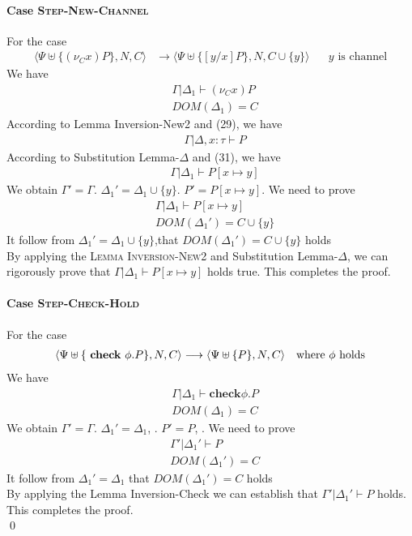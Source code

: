 \documentclass[master,english]{kuisthesis}
\theoremstyle{definition}
\begin{document}
\paragraph{Case \textsc{Step-New-Channel}} For the case
\begin{align*}
  \langle\Psi \uplus\{(\nu_C x) P\}, N, C\rangle &\longrightarrow\langle\Psi \uplus\{[y / x] P\}, N, C \cup \{y\}\rangle \quad \text{ $y$ is channel} 
\end{align*}\noindent
We have
\begin{align}
    &\Gamma | \Delta_1 \vdash (\nu_C x)P
    \\&DOM(\Delta_1) = C 
\end{align}\noindent
According to Lemma Inversion-New2 and (29), we have
\begin{align}
    &\Gamma |\Delta, x : \tau \vdash P  
\end{align}\noindent
According to Substitution Lemma-$\Delta$ and (31), we have
\begin{align}
    &\Gamma | \Delta_1 \vdash P[x \mapsto y]  
\end{align}\noindent
We obtain $\Gamma' = \Gamma  $. $\Delta_1' = \Delta_1 \cup \{y\} $. $P' = P[x \mapsto y]$. We need to prove
\begin{align*}
    &\Gamma | \Delta_1 \vdash P[x \mapsto y]
    \\&DOM(\Delta_1') = C \cup \{y\}
\end{align*}\noindent
It follow from $\Delta_1' = \Delta_1 \cup \{y\} $,that  $DOM(\Delta_1' ) = C \cup \{y\} $ holds
\\By applying the \textsc{Lemma Inversion-New2} and Substitution Lemma-$\Delta$, we can rigorously prove that $\Gamma | \Delta_1 \vdash P[x \mapsto y] $ holds true. This completes the proof.

\paragraph{Case \textsc{Step-Check-Hold}} For the case
\begin{align*}
\langle\Psi \uplus\{\text { \textbf{check} } \phi . P\} , N, C\rangle &\longrightarrow \langle\Psi \uplus\{P\} , N, C\rangle \quad \text{where $\phi$ holds}\\
\end{align*}\noindent
We have
\begin{align}
&\Gamma | \Delta_1 \vdash {\textbf{check} } \phi . P
    \\&DOM(\Delta_1) = C 
\end{align}\noindent
We obtain $\Gamma' = \Gamma$. $\Delta_1' = \Delta_1 $, . $P' = P$, . We need to prove
\begin{align*}
    &\Gamma' | \Delta_1' \vdash P
    \\&DOM(\Delta_1') = C 
\end{align*}\noindent
It follow from $\Delta_1' = \Delta_1 $ that  $DOM(\Delta_1') = C $ holds
\\By applying the {Lemma Inversion-Check}  we can establish that  $ \Gamma' | \Delta_1' \vdash P $ holds. This completes the proof.\\
\qed
\end{document}
